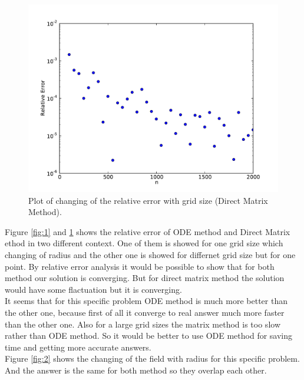 \documentclass[10pt]{article}
\begin{document}
\begin{figure}[hbt]
  \begin{center}
    \includegraphics[scale=0.4]{Plots/plot5.pdf}
    \caption{\label{fig:3} Plot of changing of the relative error with grid size (Direct Matrix Method).}
  \end{center}
\end{figure}

Figure \ref{fig:1} and \ref{fig:3} shows the relative error of ODE method and Direct Matrix ethod in two different context. One of them is showed for one grid size which changing of radius and the other one is showed for differnet grid size but for one point. By relative error analysis it would be possible to show that for both method our solution is converging. But for direct matrix method the solution would have some flactuation but it is converging.\\

It seems that for this specific problem ODE method is much more better than the other one, because first of all it converge to real answer much more faster than the other one. Also for a large grid sizes the matrix method is too slow rather than ODE method. So it would be better to use ODE method for saving time and getting more accurate answers. \\ 

Figure \ref{fig:2} shows the changing of the field with radius for this specific problem. And the answer is the same for both method so they overlap each other. \\
\pagebreak
\end{document}

